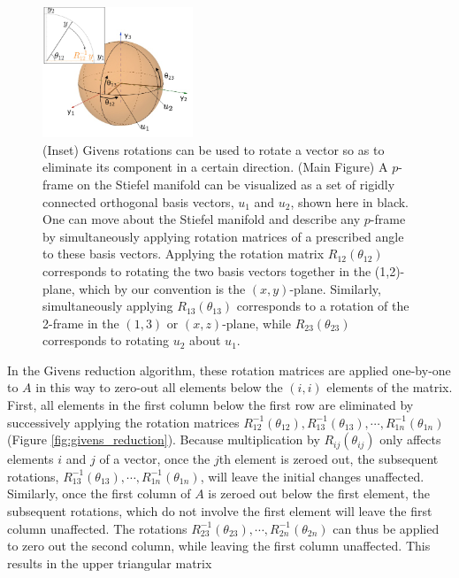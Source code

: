 \documentclass[ba]{imsart}
\numberwithin{equation}{section}
\theoremstyle{plain}
\begin{document}
\begin{figure}[h]
\centering
\vspace{.1in}
\includegraphics[width=0.4\textwidth]{figures/stiefel_geom_new.png}
\vspace{.05in}
\caption{(Inset) Givens rotations can be used to rotate a vector so as to eliminate its component in a certain direction. (Main Figure) A $p$-frame on the Stiefel manifold can be visualized as a set of rigidly connected orthogonal basis vectors, $u_1$ and $u_2$, shown here in black. One can move about the Stiefel manifold and describe any $p$-frame by simultaneously applying rotation matrices of a prescribed angle to these basis vectors. Applying the rotation matrix $R_{12}(\theta_{12})$ corresponds to rotating the two basis vectors together in the (1,2)-plane, which by our convention is the $(x,y)$-plane. Similarly, simultaneously applying $R_{13}(\theta_{13})$ corresponds to a rotation of the 2-frame in the $(1,3)$ or $(x,z)$-plane, while $R_{23}(\theta_{23})$ corresponds to rotating $u_2$ about $u_1$.}
\label{fig:StiefelGeom}
\end{figure}

\noindent In the Givens reduction algorithm, these rotation matrices are applied one-by-one to $A$ in this way to zero-out all elements below the $(i,i)$ elements of the matrix. First, all elements in the first column below the first row are eliminated by successively applying the rotation matrices $R_{12}^{-1}(\theta_{12}), R_{13}^{-1}(\theta_{13}), \cdots, R_{1n}^{-1}(\theta_{1n})$  (Figure \ref{fig:givens_reduction}). Because multiplication by $R_{ij}(\theta_{ij})$ only affects elements $i$ and $j$ of a vector, once the $j$th element is zeroed out, the subsequent rotations, $R_{13}^{-1}(\theta_{13}), \cdots, R_{1n}^{-1}(\theta_{1n})$, will leave the initial changes unaffected. Similarly, once the first column of $A$ is zeroed out below the first element, the subsequent rotations, which do not involve the first element will leave the first column unaffected. The rotations  $R_{23}^{-1}(\theta_{23}), \cdots, R_{2n}^{-1}(\theta_{2n})$ can thus be applied to zero out the second column, while leaving the first column unaffected. This results in the upper triangular matrix
\end{document}
